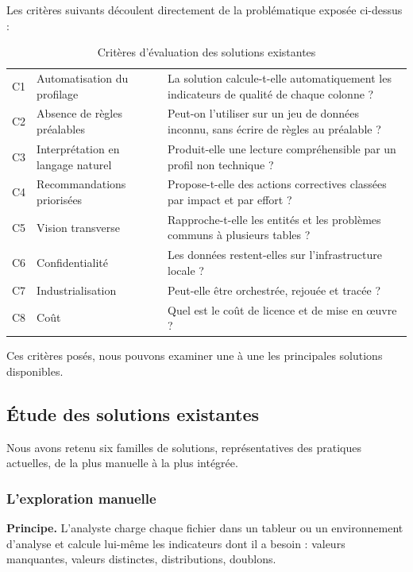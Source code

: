 Les critères suivants découlent directement de la problématique exposée ci-dessus :

\begin{table}[H]
\centering
\small
\begin{tabular}{|C{1.1cm}|L{4.2cm}|L{8.7cm}|}
\hline
{} &  &  \\ \hline
C1 & Automatisation du profilage & La solution calcule-t-elle automatiquement les indicateurs de qualité de chaque colonne ? \\ \hline
C2 & Absence de règles préalables & Peut-on l'utiliser sur un jeu de données inconnu, sans écrire de règles au préalable ? \\ \hline
C3 & Interprétation en langage naturel & Produit-elle une lecture compréhensible par un profil non technique ? \\ \hline
C4 & Recommandations priorisées & Propose-t-elle des actions correctives classées par impact et par effort ? \\ \hline
C5 & Vision transverse & Rapproche-t-elle les entités et les problèmes communs à plusieurs tables ? \\ \hline
C6 & Confidentialité & Les données restent-elles sur l'infrastructure locale ? \\ \hline
C7 & Industrialisation & Peut-elle être orchestrée, rejouée et tracée ? \\ \hline
C8 & Coût & Quel est le coût de licence et de mise en œuvre ? \\ \hline
\end{tabular}
\caption{Critères d'évaluation des solutions existantes}
\label{tab:criteres}
\end{table}

Ces critères posés, nous pouvons examiner une à une les principales solutions disponibles.

\subsection{Étude des solutions existantes}

Nous avons retenu six familles de solutions, représentatives des pratiques actuelles, de la plus manuelle à la plus intégrée.

\subsubsection{L'exploration manuelle}

\textbf{Principe.} L'analyste charge chaque fichier dans un tableur ou un environnement d'analyse et calcule lui-même les indicateurs dont il a besoin : valeurs manquantes, valeurs distinctes, distributions, doublons.

